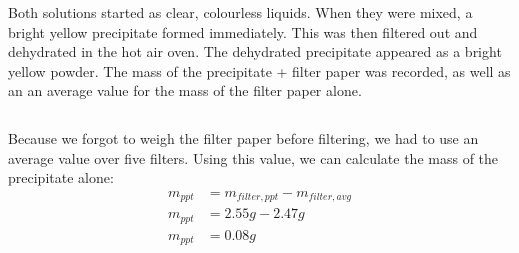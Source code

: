 Both solutions started as clear, colourless liquids. When they were mixed, a bright yellow precipitate formed immediately. This was then filtered out and dehydrated in the hot air oven. The dehydrated precipitate appeared as a bright yellow powder. The mass of the precipitate + filter paper was recorded, as well as an an average value for the mass of the filter paper alone.

$$$$

Because we forgot to weigh the filter paper before filtering, we had to use an average value over five filters. Using this value, we can calculate the mass of the precipitate alone:
\begin{align*}
    m_{ppt} &= m_{filter,ppt} - m_{filter,avg} \\
    m_{ppt} &= 2.55g - 2.47g \\
    m_{ppt} &= 0.08g
\end{align*}
